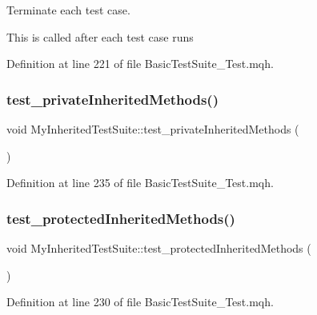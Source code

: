 Terminate each test case. 

This is called after each test case runs 

Definition at line 221 of file Basic\+Test\+Suite\+\_\+\+Test.\+mqh.

\mbox{\label{class_my_inherited_test_suite_a17797338b2152e4c8d5354f2efd30692}} 
\subsubsection{\texorpdfstring{test\+\_\+private\+Inherited\+Methods()}{test\_privateInheritedMethods()}}
{\footnotesize\ttfamily void My\+Inherited\+Test\+Suite\+::test\+\_\+private\+Inherited\+Methods (\begin{DoxyParamCaption}{ }\end{DoxyParamCaption})\hspace{0.3cm}{\ttfamily [inline]}}



Definition at line 235 of file Basic\+Test\+Suite\+\_\+\+Test.\+mqh.

\mbox{\label{class_my_inherited_test_suite_a7fef4b3ee5331b5454ce3b6b66813e6d}} 
\subsubsection{\texorpdfstring{test\+\_\+protected\+Inherited\+Methods()}{test\_protectedInheritedMethods()}}
{\footnotesize\ttfamily void My\+Inherited\+Test\+Suite\+::test\+\_\+protected\+Inherited\+Methods (\begin{DoxyParamCaption}{ }\end{DoxyParamCaption})\hspace{0.3cm}{\ttfamily [inline]}}



Definition at line 230 of file Basic\+Test\+Suite\+\_\+\+Test.\+mqh.

